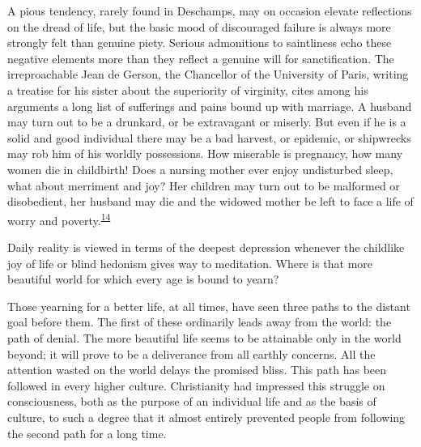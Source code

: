 A pious tendency, rarely found in Deschamps, may on occasion elevate
reflections on the dread of life, but the basic mood of discouraged
failure is always more strongly felt than genuine piety. Serious
admonitions to saintliness echo these negative elements more than they
reflect a genuine will for sanctification. The irreproachable Jean de
Gerson, the Chancellor of the University of Paris, writing a treatise
for his sister about the superiority of virginity, cites among his
arguments a long list of sufferings and pains bound up with marriage. A
husband may turn out to be a drunkard, or be extravagant or miserly. But
even if he is a solid and good individual there may be a bad harvest, or
epidemic, or shipwrecks may rob him of his worldly possessions. How
miserable is pregnancy, how many women die in childbirth! Does a nursing
mother ever enjoy undisturbed sleep, what about merriment and joy? Her
children may turn out to be malformed or disobedient, her husband may
die and the widowed mother be left to face a life of worry and
poverty.\textsuperscript{\protect\hypertarget{09_Chapter_Two__THE_CRAVING_FOR_A_M.xhtmlux5cux23id_2059}{\protect\hyperlink{23_NOTES.xhtmlux5cux23page_402}{14}}}

Daily reality is viewed in terms of the deepest depression whenever the
childlike joy of life or blind hedonism gives way to meditation. Where
is that more beautiful world for which every age is bound to yearn?

Those yearning for a better life, at all times, have seen three paths to
the distant goal before them. The first of these ordinarily leads away
from the world: the path of denial. The more beautiful life seems to be
attainable only in the world beyond; it will prove to be a deliverance
from all earthly concerns. All the attention wasted on the world delays
the promised bliss. This path has been followed in every higher culture.
Christianity had impressed this struggle on consciousness, both as the
purpose of an individual life and as the basis of culture, to such a
degree that it almost entirely prevented people from following the
second path for a long time.

